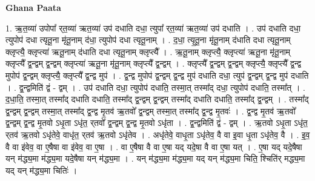\documentclass[17pt]{extarticle}
\begin{document}
\textbf{Ghana Paata } \newline

1. ऋ॒त॒व्या॑ उपोपा᳚ र्‌त॒व्या॑ ऋत॒व्या॑ उप॑ दधाति दधा॒ त्युपा᳚ र्‌त॒व्या॑ ऋत॒व्या॑ उप॑ दधाति । . उप॑ दधाति दधा॒ त्युपोप॑ दधा त्यृतू॒ना मृ॑तू॒नाम् द॑धा॒ त्युपोप॑ दधा त्यृतू॒नाम् । . द॒धा॒ त्यृ॒तू॒ना मृ॑तू॒नाम् द॑धाति दधा त्यृतू॒नाम् क्लृप्त्यै॒ क्लृप्त्या॑ ऋतू॒नाम् द॑धाति दधा त्यृतू॒नाम् क्लृप्त्यै᳚ । . ऋ॒तू॒नाम् क्लृप्त्यै॒ क्लृप्त्या॑ ऋतू॒ना मृ॑तू॒नाम् क्लृप्त्यै᳚ द्व॒न्द्वम् द्व॒न्द्वम् क्लृप्त्या॑ ऋतू॒ना मृ॑तू॒नाम् क्लृप्त्यै᳚ द्व॒न्द्वम् । . क्लृप्त्यै᳚ द्व॒न्द्वम् द्व॒न्द्वम् क्लृप्त्यै॒ क्लृप्त्यै᳚ द्व॒न्द्व मुपोप॑ द्व॒न्द्वम् क्लृप्त्यै॒ क्लृप्त्यै᳚ द्व॒न्द्व मुप॑ । . द्व॒न्द्व मुपोप॑ द्व॒न्द्वम् द्व॒न्द्व मुप॑ दधाति दधा॒ त्युप॑ द्व॒न्द्वम् द्व॒न्द्व मुप॑ दधाति । . द्व॒न्द्वमिति॑ द्वं - द्वम् । . उप॑ दधाति दधा॒ त्युपोप॑ दधाति॒ तस्मा॒त् तस्मा᳚द् दधा॒ त्युपोप॑ दधाति॒ तस्मा᳚त् । . द॒धा॒ति॒ तस्मा॒त् तस्मा᳚द् दधाति दधाति॒ तस्मा᳚द् द्व॒न्द्वम् द्व॒न्द्वम् तस्मा᳚द् दधाति दधाति॒ तस्मा᳚द् द्व॒न्द्वम् । . तस्मा᳚द् द्व॒न्द्वम् द्व॒न्द्वम् तस्मा॒त् तस्मा᳚द् द्व॒न्द्व मृ॒तव॑ ऋ॒तवो᳚ द्व॒न्द्वम् तस्मा॒त् तस्मा᳚द् द्व॒न्द्व मृ॒तवः॑ । . द्व॒न्द्व मृ॒तव॑ ऋ॒तवो᳚ द्व॒न्द्वम् द्व॒न्द्व मृ॒तवो ऽधृ॒ता ऽधृ॑त॒ र्‌तवो᳚ द्व॒न्द्वम् द्व॒न्द्व मृ॒तवो ऽधृ॑ता । . द्व॒न्द्वमिति॑ द्वं - द्वम् । . ऋ॒तवो ऽधृ॒ता ऽधृ॑त॒ र्‌तव॑ ऋ॒तवो ऽधृ॑तेवे॒ वाधृ॑त॒ र्‌तव॑ ऋ॒तवो ऽधृ॑तेव । . अधृ॑तेवे॒ वाधृ॒ता ऽधृ॑तेव॒ वै वा इ॒वा धृ॒ता ऽधृ॑तेव॒ वै । . इ॒व॒ वै वा इ॑वेव॒ वा ए॒षैषा वा इ॑वेव॒ वा ए॒षा । . वा ए॒षैषा वै वा ए॒षा यद् यदे॒षा वै वा ए॒षा यत् । . ए॒षा यद् यदे॒षैषा यन् म॑द्ध्य॒मा म॑द्ध्य॒मा यदे॒षैषा यन् म॑द्ध्य॒मा । . यन् म॑द्ध्य॒मा म॑द्ध्य॒मा यद् यन् म॑द्ध्य॒मा चिति॒ श्चिति॑र् मद्ध्य॒मा यद् यन् म॑द्ध्य॒मा चितिः॑ । \newline
\end{document}
